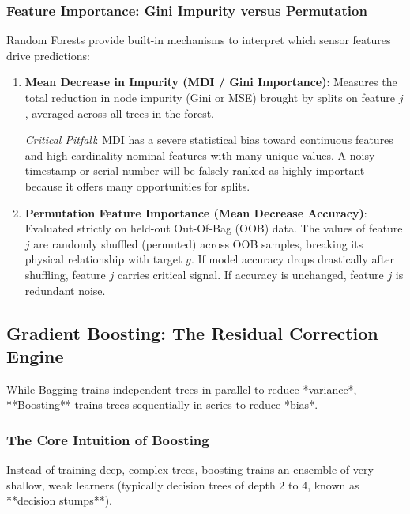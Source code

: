 \subsubsection{Feature Importance: Gini Impurity versus Permutation}
Random Forests provide built-in mechanisms to interpret which sensor features drive predictions:
\begin{enumerate}
    \item \textbf{Mean Decrease in Impurity (MDI / Gini Importance)}:
    Measures the total reduction in node impurity (Gini or MSE) brought by splits on feature $j$, averaged across all trees in the forest.
    
    \textit{Critical Pitfall}: MDI has a severe statistical bias toward continuous features and high-cardinality nominal features with many unique values. A noisy timestamp or serial number will be falsely ranked as highly important because it offers many opportunities for splits.
    
    \item \textbf{Permutation Feature Importance (Mean Decrease Accuracy)}:
    Evaluated strictly on held-out Out-Of-Bag (OOB) data. The values of feature $j$ are randomly shuffled (permuted) across OOB samples, breaking its physical relationship with target $y$. If model accuracy drops drastically after shuffling, feature $j$ carries critical signal. If accuracy is unchanged, feature $j$ is redundant noise.
\end{enumerate}

\subsection{Gradient Boosting: The Residual Correction Engine}\label{subsec:gradient_boosting}

While Bagging trains independent trees in parallel to reduce *variance*, **Boosting** trains trees sequentially in series to reduce *bias*.

\subsubsection{The Core Intuition of Boosting}
Instead of training deep, complex trees, boosting trains an ensemble of very shallow, weak learners (typically decision trees of depth $2$ to $4$, known as **decision stumps**). 

